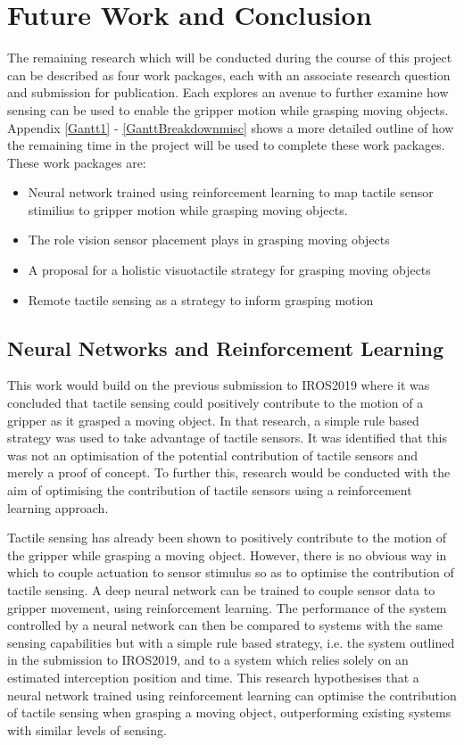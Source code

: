 \chapter{Future Work and Conclusion}

The remaining research which will be conducted during the course of this project can be described as four work packages, each with an associate research question and submission for publication. Each explores an avenue to further examine how sensing can be used to enable the gripper motion while grasping moving objects. Appendix \ref{Gantt1} - \ref{GanttBreakdownmisc} shows a more detailed outline of how the remaining time in the project will be used to complete these work packages. These work packages are:
\begin{itemize}
    \item Neural network trained using reinforcement learning to map tactile sensor stimilius to gripper motion while grasping moving objects.
    \item The role vision sensor placement plays in grasping moving objects
    \item A proposal for a holistic visuotactile strategy for grasping moving objects
    \item Remote tactile sensing as a strategy to inform grasping motion
\end{itemize}

\section{Neural Networks and Reinforcement Learning} \label{RL}


This work would build on the previous submission to IROS2019 where it was concluded that tactile sensing could positively contribute to the motion of a gripper as it grasped a moving object. In that research, a simple rule based strategy was used to take advantage of tactile sensors. It was identified that this was not an optimisation of the potential contribution of tactile sensors and merely a proof of concept. To further this, research would be conducted with the aim of optimising the contribution of tactile sensors using a reinforcement learning approach.

Tactile sensing has already been shown to positively contribute to the motion of the gripper while grasping a moving object. However, there is no obvious way in which to couple actuation to sensor stimulus so as to optimise the contribution of tactile sensing. A deep neural network can be trained to couple sensor data to gripper movement, using reinforcement learning. The performance of the system controlled by a neural network can then be compared to systems with the same sensing capabilities but with a simple rule based strategy, i.e. the system outlined in the submission to IROS2019, and to a system which relies solely on an estimated interception position and time. This research hypothesises that a neural network trained using reinforcement learning can optimise the contribution of tactile sensing when grasping a moving object, outperforming existing systems with similar levels of sensing.

